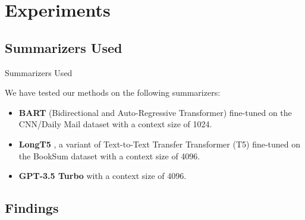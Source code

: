 \section{Experiments}


	\subsection{Summarizers Used}

		\begin{frame}{Summarizers Used}

			We have tested our methods on the following summarizers:

			\begin{itemize}
				\item \textbf{BART} (Bidirectional and Auto-Regressive Transformer)
				\citep{lewis-etal-2020-bart} fine-tuned on the CNN/Daily Mail dataset
				with a context size of 1024.
				\item \textbf{LongT5} \citep{guo2021longt5}, a variant of Text-to-Text
				Transfer Transformer (T5) \citep{raffel2020exploring} fine-tuned on the
				BookSum dataset with a context size of 4096.
				\item \textbf{GPT-3.5 Turbo} \citep{brown2020language} with a context
				size of 4096.
			\end{itemize}

		\end{frame}


	\subsection{Findings}

